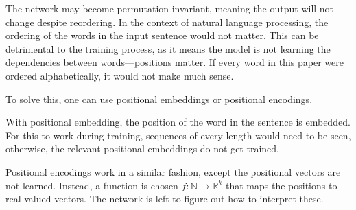 The network may become permutation invariant, meaning the output will not change despite reordering. In the context of natural language processing, the ordering of the words in the input sentence would not matter. This can be detrimental to the training process, as it means the model is not learning the dependencies between words---positions matter. If every word in this paper were ordered alphabetically, it would not make much sense.

To solve this, one can use positional embeddings or positional encodings.

With positional embedding, the position of the word in the sentence is embedded. For this to work during training, sequences of every length would need to be seen, otherwise, the relevant positional embeddings do not get trained.

Positional encodings work in a similar fashion, except the positional vectors are not learned.
Instead, a function is chosen $f:\mathbb{N}\rightarrow\mathbb{R}^k$ that maps the positions to real-valued vectors. The network is left to figure out how to interpret these.\cite{TransformersScratchPeterbloem}